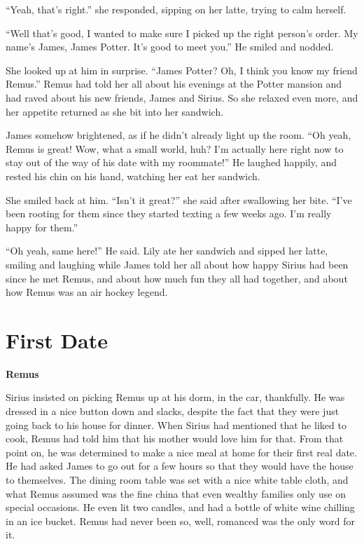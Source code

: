 \documentclass[12pt,twoside,openright]{memoir}
\begin{document}
``Yeah, that's right.'' she responded, sipping on her latte, trying to calm herself.

``Well that's good, I wanted to make sure I picked up the right person's order. My name's James, James Potter. It's good to meet you.'' He smiled and nodded.

She looked up at him in surprise. ``James Potter? Oh, I think you know my friend Remus.'' Remus had told her all about his evenings at the Potter mansion and had raved about his new friends, James and Sirius. So she relaxed even more, and her appetite returned as she bit into her sandwich.

James somehow brightened, as if he didn't already light up the room. ``Oh yeah, Remus is great! Wow, what a small world, huh? I'm actually here right now to stay out of the way of his date with my roommate!'' He laughed happily, and rested his chin on his hand, watching her eat her sandwich.

She smiled back at him. ``Isn't it great?'' she said after swallowing her bite. ``I've been rooting for them since they started texting a few weeks ago. I'm really happy for them.''

``Oh yeah, same here!'' He said. Lily ate her sandwich and sipped her latte, smiling and laughing while James told her all about how happy Sirius had been since he met Remus, and about how much fun they all had together, and about how Remus was an air hockey legend.

\chapter{First Date}

\textbf{Remus} 

Sirius insisted on picking Remus up at his dorm, in the car, thankfully. He was dressed in a nice button down and slacks, despite the fact that they were just going back to his house for dinner. When Sirius had mentioned that he liked to cook, Remus had told him that his mother would love him for that. From that point on, he was determined to make a nice meal at home for their first real date. He had asked James to go out for a few hours so that they would have the house to themselves. The dining room table was set with a nice white table cloth, and what Remus assumed was the fine china that even wealthy families only use on special occasions. He even lit two candles, and had a bottle of white wine chilling in an ice bucket. Remus had never been so, well, romanced was the only word for it. 
\end{document}
